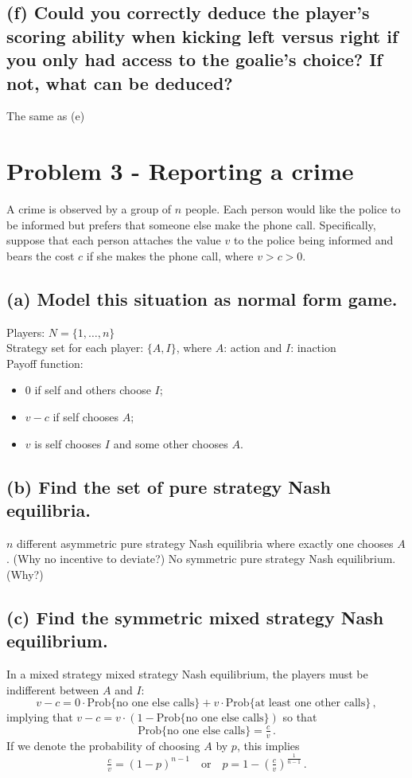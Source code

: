 \documentclass{article}
\begin{document}
\subsection*{(f) Could you correctly deduce the player's scoring ability when kicking left versus right if you only had access to the goalie's choice? If not, what can be deduced?}

The same as (e)


\newpage

\section{Problem 3 - Reporting a crime}

A crime is observed by a group of $n$ people. Each person would like the police to be informed
but prefers that someone else make the phone call. Specifically, suppose that each person
attaches the value $v$ to the police being informed and bears the cost $c$ if she makes the
phone call, where $v > c > 0$.

\subsection*{(a) Model this situation as normal form game.}  


 Players: $N = \{1, \dots , n \}$ \\ 
 Strategy set for each player: $\{A, I \}$, where $A$: action and $I$: inaction \\ 
 Payoff function: 

\begin{itemize}
\item $0$ if self and others choose $I$; 
\item $v-c$ if self chooses $A$; 
\item $v$ is self chooses $I$ and some other chooses $A$.
\end{itemize}




%
\subsection*{(b) Find the set of pure strategy Nash equilibria. } 

 $n$ different asymmetric pure strategy Nash equilibria where exactly one chooses $A$. (Why no incentive to deviate?) No symmetric pure strategy Nash equilibrium. (Why?)
%
\subsection*{(c) Find the symmetric mixed strategy Nash equilibrium.}
 In a mixed strategy mixed strategy Nash equilibrium, the players must be indifferent between $A$ and $I$:$$v-c = 0 \cdot \text{Prob}\{\text{no one else calls}\} + v \cdot \text{Prob}\{\text{at least one other calls}\} \, ,$$implying that $v-c = v \cdot (1 - \text{Prob}\{\text{no one else calls}\})$ so that $$\text{Prob}\{\text{no one else calls}\} = \tfrac{c}{v} \, .$$If we denote the probability of choosing $A$ by $p$, this implies$$\tfrac{c}{v} = (1-p)^{n-1} \quad \text{or} \quad p = 1 - \left( \tfrac{c}{v} \right)^\frac1{n-1} \, .$$ 
%
\end{document}
